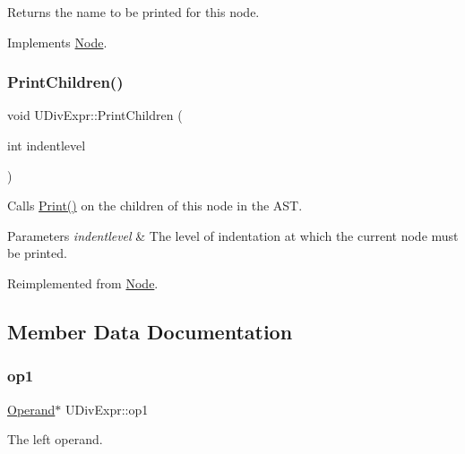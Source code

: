 Returns the name to be printed for this node. 

Implements \hyperlink{class_node_a56e29657306ffb004d69c6929ae44269}{Node}.

\mbox{\label{class_u_div_expr_aaaa57ba84ad8390c4511bdc808968e4e}} 
\subsubsection{\texorpdfstring{Print\+Children()}{PrintChildren()}}
{\footnotesize\ttfamily void U\+Div\+Expr\+::\+Print\+Children (\begin{DoxyParamCaption}\item[{int}]{indentlevel }\end{DoxyParamCaption})\hspace{0.3cm}{\ttfamily [virtual]}}

Calls \hyperlink{class_node_a9ef727fd72d1a37792b3db60a8a479dd}{Print()} on the children of this node in the A\+ST. 
\begin{DoxyParams}{Parameters}
{\em indentlevel} & The level of indentation at which the current node must be printed. \\
\hline
\end{DoxyParams}


Reimplemented from \hyperlink{class_node_a3e67ec8d22182b721717af14fe0c3000}{Node}.



\subsection{Member Data Documentation}
\mbox{\label{class_u_div_expr_a6cf26648d5ab920e3ada74049b97e1dc}} 
\subsubsection{\texorpdfstring{op1}{op1}}
{\footnotesize\ttfamily \hyperlink{class_operand}{Operand}$\ast$ U\+Div\+Expr\+::op1\hspace{0.3cm}{\ttfamily [protected]}}

The left operand. \mbox{\label{class_u_div_expr_a51a099174f6ba3b9506be8744b20e6f1}} 
